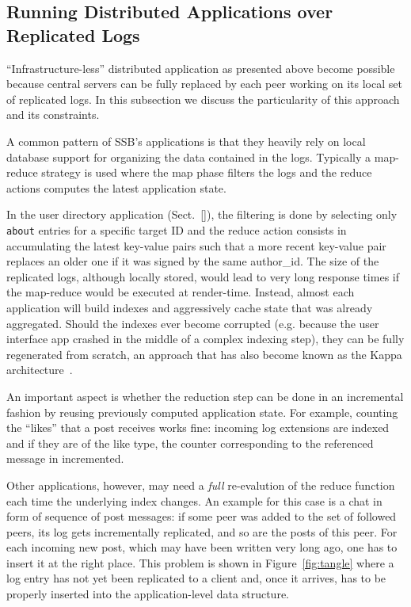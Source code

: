 \documentclass[10pt,sigconf]{acmart}
\begin{document}
\subsection{Running Distributed Applications over Replicated Logs}
\label{ssect:dapps}

``Infrastructure-less'' distributed application as presented above
become possible because central servers can be fully replaced by each
peer working on its local set of replicated logs. In this subsection
we discuss the particularity of this approach and its constraints.

A common pattern of SSB's applications is that they heavily rely
on local database support for organizing the data contained in the logs.
Typically a map-reduce strategy is used where the map phase filters
the logs and the reduce actions computes the latest application state.

In the user directory application (Sect.~\ref{}), the filtering is
done by selecting only {\tt about} entries for a specific target ID
and the reduce action consists in accumulating the latest key-value
pairs such that a more recent key-value pair replaces an older one if
it was signed by the same author\_id. The size of the replicated logs,
although locally stored, would lead to very long response times if the
map-reduce would be executed at render-time. Instead, almost each
application will build indexes and aggressively cache state that was
already aggregated. Should the indexes ever become corrupted
(e.g. because the user interface app crashed in the middle of a
complex indexing step), they can be fully regenerated from scratch, an
approach that has also become known as the Kappa architecture~\cite{}.

An important aspect is whether the reduction step can be done in an
incremental fashion by reusing previously computed application state.
For example, counting the ``likes'' that a post receives works fine:
incoming log extensions are indexed and if they are of the like type,
the counter corresponding to the referenced message in incremented.

Other applications, however, may need a {\em full} re-evalution of the
reduce function each time the underlying index changes. An example for
this case is a chat in form of sequence of post messages: if some peer was added to
the set of followed peers, its log gets incrementally replicated, and
so are the posts of this peer. For each incoming new post, which may
have been written very long ago, one has to insert it at the right
place. This problem is shown in Figure~\ref{fig:tangle} where a log
entry has not yet been replicated to a client and, once it arrives,
has to be properly inserted into the application-level data structure.
\end{document}
